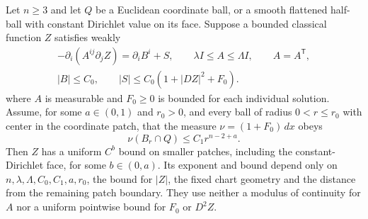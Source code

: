 \begin{lemma}
\label{lem:elliptic:natural-growth}
Let $n\ge3$ and let $Q$ be a Euclidean coordinate ball, or a smooth
flattened half-ball with constant Dirichlet value on its face.
Suppose a bounded classical function $Z$ satisfies weakly
\begin{equation}\label{eq:elliptic:natural-growth-model}
 \begin{gathered}
 -\partial_i(A^{ij}\partial_j Z)=\partial_i B^i+S,
 \qquad \lambda I\le A\le\Lambda I,\qquad A=A^{\mathsf T},\\
 |B|\le C_0,\qquad |S|\le C_0(1+|DZ|^2+F_0).
 \end{gathered}
\end{equation}
where $A$ is measurable and $F_0\ge0$ is bounded for each individual
solution.  Assume, for some $a\in(0,1)$ and $r_0>0$, and every ball
of radius $0<r\le r_0$ with center in the coordinate patch, that the measure
$\nu=(1+F_0)\,dx$ obeys
\begin{equation}\label{eq:elliptic:ng-source-morrey}
 \nu(B_r\cap Q)\le C_1r^{n-2+a}.
\end{equation}
Then $Z$ has a uniform $C^b$ bound on smaller patches, including the
constant-Dirichlet face, for some $b\in(0,a)$.  Its exponent and bound
depend only on $n,\lambda,\Lambda,C_0,C_1,a,r_0$, the bound for $|Z|$,
the fixed chart geometry and the distance from the remaining patch
boundary.  They use neither a modulus of continuity for $A$ nor a
uniform pointwise bound for $F_0$ or $D^2Z$.
\end{lemma}

